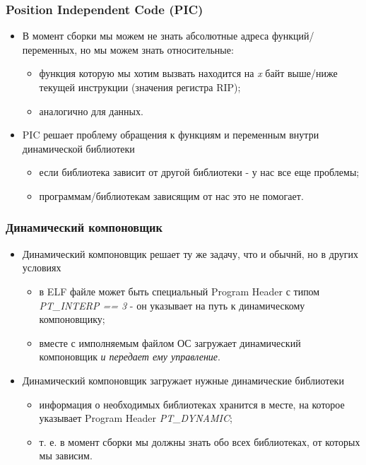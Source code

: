 \begin{frame}
\frametitle{Position Independent Code (PIC)}
\begin{itemize}
  \item В момент сборки мы можем не знать абсолютные адреса функций/переменных,
  но мы можем знать относительные:
  \begin{itemize}
    \item функция которую мы хотим вызвать находится на \emph{x} байт выше/ниже
    текущей инструкции (значения регистра RIP);
    \item аналогично для данных.
  \end{itemize}
  \item PIC решает проблему обращения к функциям и переменным внутри
  динамической библиотеки
  \begin{itemize}
    \item если библиотека зависит от другой библиотеки - у нас все еще проблемы;
    \item программам/библиотекам зависящим от нас это не помогает.
  \end{itemize}
\end{itemize}
\end{frame}

\begin{frame}
\frametitle{Динамический компоновщик}
\begin{itemize}
  \item Динамический компоновщик решает ту же задачу, что и обычнй, но в других
  условиях
  \begin{itemize}
    \item в ELF файле может быть специальный Program Header с типом
    \emph{PT\_INTERP == 3} - он указывает на путь к динамическому компоновщику;
    \item вместе с имполняемым файлом ОС загружает динамический компоновщик
    \emph{и передает ему управление}.
  \end{itemize}
  \item Динамический компоновщик загружает нужные динамические библиотеки
  \begin{itemize}
    \item информация о необходимых библиотеках хранится в месте, на которое
    указывает Program Header \emph{PT\_DYNAMIC};
    \item т. е. в момент сборки мы должны знать обо всех библиотеках, от
    которых мы зависим.
  \end{itemize}
\end{itemize}
\end{frame}

